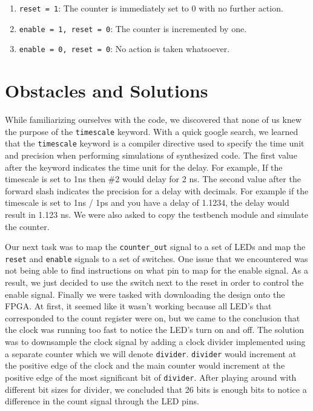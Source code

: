 \documentclass[11pt]{article}
\begin{document}
\begin{enumerate}
	\item \texttt{reset = 1}: The counter is immediately set to 0 with no further action.
	\item \texttt{enable = 1, reset = 0}: The counter is incremented by one.
	\item \texttt{enable = 0, reset = 0}: No action is taken whatsoever.
\end{enumerate}

\section*{Obstacles and Solutions}

While familiarizing ourselves with the code, we discovered that none of us knew the purpose of the  \texttt{timescale} keyword. With a quick google search, we learned that the \texttt{timescale} keyword is a compiler directive used to specify the time unit and precision when performing simulations of synthesized code. The first value after the keyword indicates the time unit for the delay. For example, If the timescale is set to 1ns then \#2 would delay for 2 ns. The second value after the forward slash indicates the precision for a delay with decimals. For example if the timescale is set to 1ns / 1ps and you have a delay of 1.1234, the delay would result in 1.123 ns. We were also asked to copy the testbench module and simulate the counter. 

Our next task was to map the \texttt{counter\_out} signal to a set of LEDs and map the \texttt{reset} and \texttt{enable} signals to a set of switches. One issue that we encountered was not being able to find instructions on what pin to map for the enable signal. As a result, we just decided to use the switch next to the reset in order to control the enable signal. Finally we were tasked with downloading the design onto the FPGA. At first, it seemed like it wasn’t working because all LED’s that corresponded to the count register were on, but we came to the conclusion that the clock was running too fast to notice the LED’s turn on and off. The solution was to downsample the clock signal by adding a clock divider implemented using a separate counter which we will denote \texttt{divider}. \texttt{divider} would increment at the positive edge of the clock and the main counter would increment at the positive edge of the most significant bit of \texttt{divider}. After playing around with different bit sizes for divider, we concluded that 26 bits is enough bits to notice a difference in the count signal through the LED pins.
\end{document}
